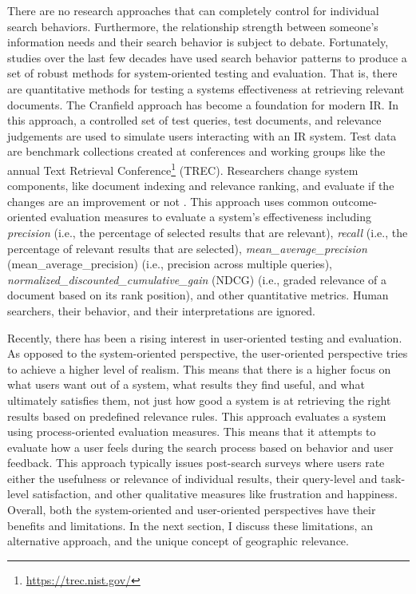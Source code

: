 There are no research approaches that can completely control for individual search behaviors. Furthermore, the relationship strength between someone's information needs and their search behavior is subject to debate. Fortunately, studies over the last few decades have used search behavior patterns to produce a set of robust methods for system-oriented testing and evaluation. That is, there are quantitative methods for testing a systems effectiveness at retrieving relevant documents. The Cranfield approach has become a foundation for modern IR. In this approach, a controlled set of test queries, test documents, and relevance judgements are used to simulate users interacting with an IR system. Test data are benchmark collections created at conferences and working groups like the annual Text Retrieval Conference\footnote{\url{https://trec.nist.gov/}} (\acrshort{TREC}). Researchers change system components, like document indexing and relevance ranking, and evaluate if the changes are an improvement or not \cite{McGill1979}. This approach uses common outcome-oriented evaluation measures to evaluate a system's effectiveness including \emph{\gls{precision}} (i.e., the percentage of selected results that are relevant), \emph{\gls{recall}} (i.e., the percentage of relevant results that are selected), \emph{\gls{mean_average_precision}} (\acrshort{mean_average_precision}) (i.e., precision across multiple queries), \emph{\gls{normalized_discounted_cumulative_gain}} (\acrshort{NDCG}) (i.e., graded relevance of a document based on its rank position), and other quantitative metrics. Human searchers, their behavior, and their interpretations are ignored.

Recently, there has been a rising interest in user-oriented testing and evaluation. As opposed to the system-oriented perspective, the user-oriented perspective tries to achieve a higher level of realism. This means that there is a higher focus on what users want out of a system, what results they find useful, and what ultimately satisfies them, not just how good a system is at retrieving the right results based on predefined relevance rules. This approach evaluates a system using process-oriented evaluation measures. This means that it attempts to evaluate how a user feels during the search process based on behavior and user feedback. This approach typically issues post-search surveys where users rate either the usefulness or relevance of individual results, their query-level and task-level satisfaction, and other qualitative measures like frustration and happiness. Overall, both the system-oriented and user-oriented perspectives have their benefits and limitations. In the next section, I discuss these limitations, an alternative approach, and the unique concept of geographic relevance.

